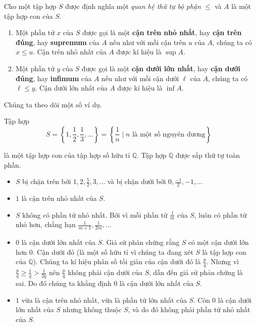\begin{definition}
    Cho một tập hợp $S$ được định nghĩa một \textit{quan hệ thứ tự bộ phận} $\leq$ và $A$ là một tập hợp con của $S$.
    \begin{enumerate}[label={(\roman*)}]
        \item Một phần tử $x$ của $S$ được gọi là một \textbf{cận trên nhỏ nhất}, hay \textbf{cận trên đúng}, hay \textbf{supremum} của $A$ nếu như với mỗi cận trên $u$ của $A$, chúng ta có $x\leq u$. Cận trên nhỏ nhất của $A$ được kí hiệu là $\sup A$.
        \item Một phần tử $y$ của $S$ được gọi là một \textbf{cận dưới lớn nhất}, hay \textbf{cận dưới đúng}, hay \textbf{infimum} của $A$ nếu như với mỗi cận dưới $\ell$ của $A$, chúng ta có $\ell\leq y$. Cận dưới lớn nhất của $A$ được kí hiệu là $\inf A$.
    \end{enumerate}
\end{definition}

Chúng ta theo dõi một số ví dụ.
\begin{example}
    Tập hợp
    \[
        S = \left\{ 1, \frac{1}{2}, \frac{1}{3}, \ldots \right\} = \left\{ \frac{1}{n} \mid \text{$n$ là một số nguyên dương} \right\}
    \]

    là một tập hợp con của tập hợp số hữu tỉ $\mathbb{Q}$. Tập hợp $\mathbb{Q}$ được sắp thứ tự toàn phần.
    \begin{itemize}
        \item $S$ bị chặn trên bởi $1, 2, \frac{5}{2}, 3, \ldots$ và bị chặn dưới bởi $0, \frac{-1}{2}, -1, \ldots$
        \item $1$ là cận trên nhỏ nhất của $S$.
        \item $S$ không có phần tử nhỏ nhất. Bởi vì mỗi phần tử $\frac{1}{m}$ của $S$, luôn có phần tử nhỏ hơn, chẳng hạn $\frac{1}{m+1}, \frac{1}{2m}, \ldots$
        \item $0$ là cận dưới lớn nhất của $S$. Giả sử phản chứng rằng $S$ có một cận dưới lớn hơn $0$. Cận dưới đó (là một số hữu tỉ vì chúng ta đang xét $S$ là tập hợp con của $\mathbb{Q}$). Chúng ta kí hiệu phân số tối giản của cận dưới đó là $\frac{p}{q}$. Nhưng vì $\frac{p}{q}\geq \frac{1}{q} > \frac{1}{2q}$ nên $\frac{p}{q}$ không phải cận dưới của $S$, dẫn đến giả sử phản chứng là sai. Do đó chúng ta khẳng định $0$ là cận dưới lớn nhất của $S$.
        \item $1$ vừa là cận trên nhỏ nhất, vừa là phần tử lớn nhất của $S$. Còn $0$ là cận dưới lớn nhất của $S$ nhưng không thuộc $S$, và do đó không phải phần tử nhỏ nhất của $S$.
    \end{itemize}
\end{example}

